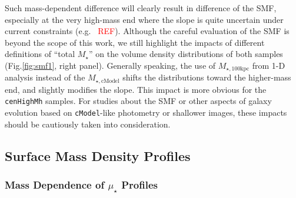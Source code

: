 \documentclass{emulateapj}
\def\cmodel{\texttt{cModel}}
\def\rbcg{\texttt{cenHighMh}}
\def\mstar{{$M_{\star}$}}
\def\mtot{{$M_{\star,100\mathrm{kpc}}$}}
\def\mcmodel{{$M_{\star,\mathrm{cModel}}$}}
\def\mden{{$\mu_{\star}$}}
\newcommand{\addref}{{\textcolor{red}{REF}}}
\begin{document}
\begin{CJK*}{UTF8}{gbsn}
    Such mass-dependent difference will clearly result in difference of the SMF, 
    especially at the very high-mass end where the slope is quite uncertain under
    current constraints (e.g. \ \addref{}).
    Although the careful evaluation of the SMF is beyond the scope of this work, 
    we still highlight the impacts of different definitions of ``total \mstar{}''
    on the volume density distributions of both samples (Fig.\ref{fig:smf1}, 
    right panel).  
    Generally speaking, the use of \mtot{} from 1-D analysis instead of the
    \mcmodel{} shifts the distributions toward the higher-mass end, and slightly 
    modifies the slope.
    This impact is more obvious for the \rbcg{} samples.
    For studies about the SMF or other aspects of galaxy evolution based on 
    \cmodel{}-like photometry or shallower images, these impacts should be 
    cautiously taken into consideration.

    
\subsection{Surface Mass Density Profiles}
    \label{ssec:sbp_compare}

\subsubsection{Mass Dependence of \mden{} Profiles}
    \label{sssec:sbp_inter}
          

\end{CJK*}
\end{document}
